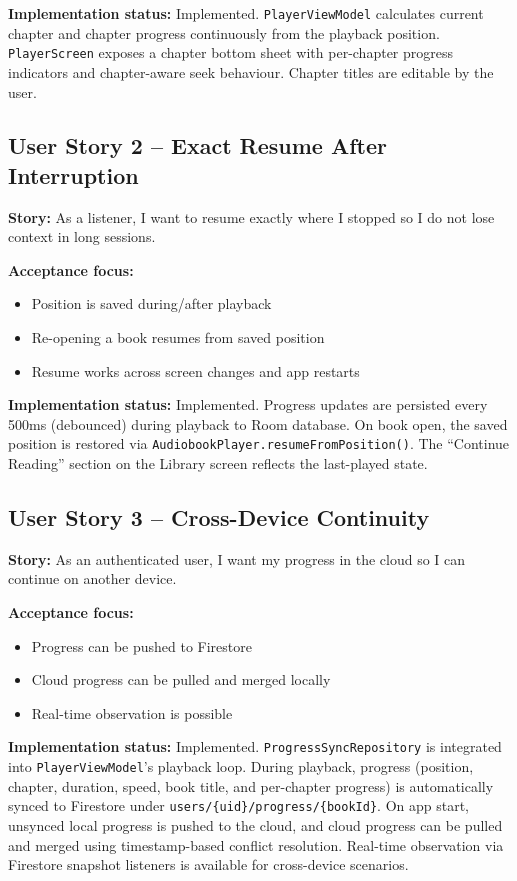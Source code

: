 \documentclass[11pt,a4paper]{article}
\begin{document}
\textbf{Implementation status:} Implemented. \texttt{PlayerViewModel} calculates current chapter and chapter progress continuously from the playback position. \texttt{PlayerScreen} exposes a chapter bottom sheet with per-chapter progress indicators and chapter-aware seek behaviour. Chapter titles are editable by the user.

\subsection{User Story 2 -- Exact Resume After Interruption}

\textbf{Story:} As a listener, I want to resume exactly where I stopped so I do not lose context in long sessions.

\textbf{Acceptance focus:}
\begin{itemize}[noitemsep]
    \item Position is saved during/after playback
    \item Re-opening a book resumes from saved position
    \item Resume works across screen changes and app restarts
\end{itemize}

\textbf{Implementation status:} Implemented. Progress updates are persisted every 500ms (debounced) during playback to Room database. On book open, the saved position is restored via \texttt{AudiobookPlayer.resumeFromPosition()}. The ``Continue Reading'' section on the Library screen reflects the last-played state.

\subsection{User Story 3 -- Cross-Device Continuity}

\textbf{Story:} As an authenticated user, I want my progress in the cloud so I can continue on another device.

\textbf{Acceptance focus:}
\begin{itemize}[noitemsep]
    \item Progress can be pushed to Firestore
    \item Cloud progress can be pulled and merged locally
    \item Real-time observation is possible
\end{itemize}

\textbf{Implementation status:} Implemented. \texttt{ProgressSyncRepository} is integrated into \texttt{PlayerViewModel}'s playback loop. During playback, progress (position, chapter, duration, speed, book title, and per-chapter progress) is automatically synced to Firestore under \texttt{users/\{uid\}/progress/\{bookId\}}. On app start, unsynced local progress is pushed to the cloud, and cloud progress can be pulled and merged using timestamp-based conflict resolution. Real-time observation via Firestore snapshot listeners is available for cross-device scenarios.
\end{document}
